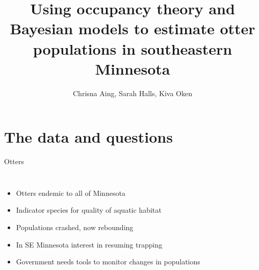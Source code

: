 \documentclass{beamer}
\title{Using occupancy theory and Bayesian models to estimate otter populations in southeastern Minnesota}
\author[Aing, Halls, Oken]{Chrisna Aing, Sarah Halls, Kiva Oken}
\institute{Carleton College}
\begin{document}
	{

\begin{frame}
	\titlepage
\end{frame}
}
\begin{frame}
	\tableofcontents[pausesections]
\end{frame}

\section{The data and questions}
\begin{frame}{Otters}
	\begin{columns}
		\column{5cm}
		\begin{itemize}[<+->]
			\item Otters endemic to all of Minnesota
			\item Indicator species for quality of aquatic habitat
			\item Populations crashed, now rebounding
			\item In SE Minnesota interest in resuming trapping
			\item Government needs tools to monitor changes in populations
		\end{itemize}
		\column{5cm}
	\end{columns}
\end{frame}
\end{document}
